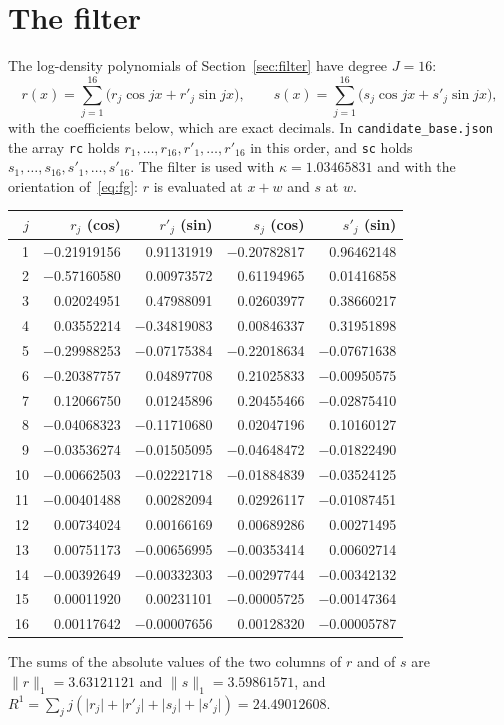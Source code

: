 \documentclass[11pt]{article}
\theoremstyle{definition}
\newcommand{\abs}[1]{\lvert #1\rvert}
\begin{document}
\appendix
\section{The filter}\label{app:filter}
The log-density polynomials of Section~\ref{sec:filter} have degree $J=16$:
\[
 r(x)=\sum_{j=1}^{16}\bigl(r_j\cos jx+r'_j\sin jx\bigr),\qquad s(x)=\sum_{j=1}^{16}\bigl(s_j\cos jx+s'_j\sin jx\bigr),
\]
with the coefficients below, which are exact decimals. In \texttt{candidate\_base.json} the array \texttt{rc} holds
$r_1,\dots,r_{16},r'_1,\dots,r'_{16}$ in this order, and \texttt{sc} holds $s_1,\dots,s_{16},s'_1,\dots,s'_{16}$.
The filter is used with $\kappa=1.03465831$ and with the orientation of~\eqref{eq:fg}: $r$ is evaluated at $x+w$
and $s$ at $w$.
\begin{center}
\begin{tabular}{rrrrr}
\toprule
$j$ & $r_j$ (cos) & $r'_j$ (sin) & $s_j$ (cos) & $s'_j$ (sin)\\
\midrule
1 & $-$0.21919156 & 0.91131919 & $-$0.20782817 & 0.96462148\\
2 & $-$0.57160580 & 0.00973572 & 0.61194965 & 0.01416858\\
3 & 0.02024951 & 0.47988091 & 0.02603977 & 0.38660217\\
4 & 0.03552214 & $-$0.34819083 & 0.00846337 & 0.31951898\\
5 & $-$0.29988253 & $-$0.07175384 & $-$0.22018634 & $-$0.07671638\\
6 & $-$0.20387757 & 0.04897708 & 0.21025833 & $-$0.00950575\\
7 & 0.12066750 & 0.01245896 & 0.20455466 & $-$0.02875410\\
8 & $-$0.04068323 & $-$0.11710680 & 0.02047196 & 0.10160127\\
9 & $-$0.03536274 & $-$0.01505095 & $-$0.04648472 & $-$0.01822490\\
10 & $-$0.00662503 & $-$0.02221718 & $-$0.01884839 & $-$0.03524125\\
11 & $-$0.00401488 & 0.00282094 & 0.02926117 & $-$0.01087451\\
12 & 0.00734024 & 0.00166169 & 0.00689286 & 0.00271495\\
13 & 0.00751173 & $-$0.00656995 & $-$0.00353414 & 0.00602714\\
14 & $-$0.00392649 & $-$0.00332303 & $-$0.00297744 & $-$0.00342132\\
15 & 0.00011920 & 0.00231101 & $-$0.00005725 & $-$0.00147364\\
16 & 0.00117642 & $-$0.00007656 & 0.00128320 & $-$0.00005787\\
\bottomrule
\end{tabular}
\end{center}
The sums of the absolute values of the two columns of $r$ and of $s$ are $\|r\|_1=3.63121121$ and
$\|s\|_1=3.59861571$, and $R^1=\sum_jj(\abs{r_j}+\abs{r'_j}+\abs{s_j}+\abs{s'_j})=24.49012608$.
\end{document}
